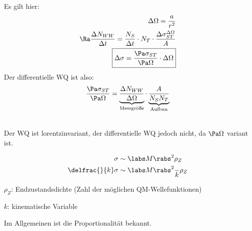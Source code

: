   Es gilt hier:
\begin{align}
\begin{split}
\Delta \Omega = \frac{a}{r^2}\\
\Ra \frac{\Delta N_{WW}}{\Delta t} = \frac{N_S}{\Delta t} \cdot N_T \cdot \frac{\Delta \sigma_{ST}^{\Delta \Omega}}{A}\\
\boxed{ \Delta \sigma = \frac{\Pa \sigma_{ST}}{\Pa \Omega}\cdot \Delta \Omega }
\end{split}
\end{align}
Der differentielle WQ ist also:
\begin{align}
\frac{\Pa \sigma_{ST}}{\Pa \Omega} = \underbrace{\frac{\Delta N_{WW}}{\Delta \Omega}}_\text{Messgröße} \cdot \underbrace{\frac{A}{N_S N_T}}_\text{Aufbau}
\end{align}
\begin{framed}
\\
Der WQ ist lorentzinvariant, der differentielle WQ jedoch nicht, da $\Pa \Omega$ variant ist.
\end{framed}

\begin{align}
\begin{split}
\sigma &\sim \labs M \rabs ^2 \rho_Z\\
\delfrac{}{k} \sigma &\sim \labs M \rabs^2 \dfrac{}{k} \rho_Z
\end{split}
\end{align}
\begin{compactitem}
\item $\rho_Z$: Endzustandsdichte (\glqq Zahl der möglichen QM-Wellefunktionen\grqq{})
\item $k$: kinematische Variable
\end{compactitem}
Im Allgemeinen ist die Proportionalität bekannt.

